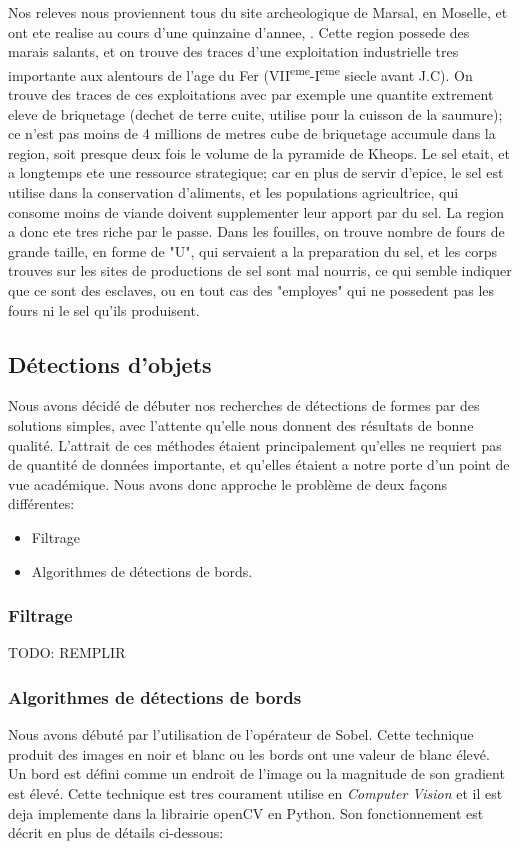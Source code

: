\documentclass[a4paper, 12pt, titlepage, oneside, french]{article}
\begin{document}
	Nos releves nous proviennent tous du site archeologique de Marsal, en Moselle, et ont ete realise au cours d'une quinzaine d'annee, %
	. Cette region possede des marais salants, et on trouve des traces d'une exploitation industrielle tres importante aux alentours de l'age du Fer (VII\textsuperscript{eme}-I\textsuperscript{eme} siecle avant J.C). On trouve des traces de ces exploitations avec par exemple une quantite extrement eleve de briquetage (dechet de terre cuite, utilise pour la cuisson de la saumure); ce n'est pas moins de 4 millions de metres cube de briquetage accumule dans la region, soit presque deux fois le volume de la pyramide de Kheops. Le sel etait, et a longtemps ete une ressource strategique; car en plus de servir d'epice, le sel est utilise dans la conservation d'aliments, et les populations agricultrice, qui consome moins de viande doivent supplementer leur apport par du sel. La region a donc ete tres riche par le passe. Dans les fouilles, on trouve nombre de fours de grande taille, en forme de "U", qui servaient a la preparation du sel, et les corps trouves sur les sites de productions de sel sont mal nourris, ce qui semble indiquer que ce sont des esclaves, ou en tout cas des "employes" qui ne possedent pas les fours ni le sel qu'ils produisent. 



	\subsection{Détections d'objets}
	Nous avons décidé de débuter nos recherches de détections de formes par des solutions simples, avec l'attente qu'elle nous donnent des résultats de bonne qualité. L'attrait de ces méthodes étaient principalement qu'elles ne requiert pas de quantité de données importante, et qu'elles étaient a notre porte d'un point de vue académique. Nous avons donc approche le problème de deux façons différentes:
	\begin{itemize}
		\item Filtrage
		\item Algorithmes de détections de bords.
	\end{itemize}
	\subsubsection{Filtrage}
	{TODO: REMPLIR}

	\subsubsection{Algorithmes de détections de bords}
	Nous avons débuté par l'utilisation de l'opérateur de Sobel\cite{SobelOp}. Cette technique produit des images en noir et blanc ou les bords ont une valeur de blanc élevé. Un bord est défini comme un endroit de l'image ou la magnitude de son gradient est élevé. Cette technique est tres courament utilise en \textit{Computer Vision} et il est deja implemente dans la librairie openCV en Python. Son fonctionnement est décrit en plus de détails ci-dessous: 
\end{document}
